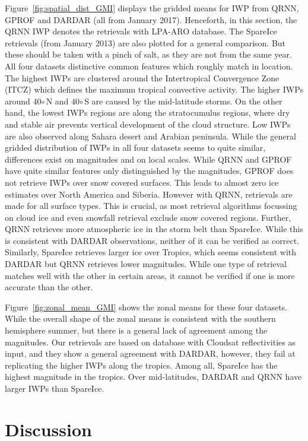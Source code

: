 \documentclass[amt, manuscript]{copernicus}
\begin{document}
Figure~\ref{fig:spatial_dist_GMI} displays the gridded means for IWP from QRNN, GPROF and DARDAR (all from January 2017). Henceforth, in this section, the QRNN IWP denotes the retrievals with LPA-ARO database. The SpareIce retrievals (from January 2013) are also plotted for a general comparison. But these should be taken with a pinch of salt, as they are not from the same year. All four datasets distinctive common features which roughly match in location. The highest IWPs are clustered around the Intertropical  Convergence Zone (ITCZ) which defines the maximum tropical convective activity. The higher IWPs around 40$\circ$\,N and 40$\circ$\,S are caused by the mid-latitude storms. On the other hand, the lowest IWPs regions are along the stratocumulus regions, where dry and stable air prevents vertical development of the cloud structure. Low IWPs are also observed along Sahara desert and Arabian peninsula. While the general gridded distribution of IWPs in all four datasets seems to quite similar, differences exist on magnitudes and on local scales. While QRNN and GPROF have quite similar features only distinguished by the magnitudes, GPROF does not retrieve IWPs over snow covered surfaces. This leads to almost zero ice estimates over North America and Siberia. However with QRNN, retrievals are made for all surface types. This is crucial, as most retrieval algorithms focussing on cloud ice and even snowfall retrieval \citep{rysman:slalom:18} exclude snow covered regions. Further, QRNN retrieves more atmospheric ice in the storm belt than SpareIce. While this is consistent with DARDAR observations, neither of it can be verified as correct. Similarly, SpareIce retrieves larger ice over Tropics, which seems consistent with DARDAR but QRNN retrieves lower magnitudes. While one type of retrieval matches well with the other in certain areas, it cannot be verified if one is more accurate than the other.  


Figure~\ref{fig:zonal_mean_GMI} shows the zonal means for these four datasets. While the overall shape of the zonal means is consistent with the southern hemisphere summer, but there is a general lack of agreement among the magnitudes. Our retrievals are based on database with Cloudsat reflectivities as input, and they show a general agreement with DARDAR, however, they fail at replicating the higher IWPs along the tropics. Among all, SpareIce has the highest magnitude in the tropics. Over mid-latitudes, DARDAR and QRNN have larger IWPs than SpareIce.   


\section{Discussion}
\end{document}
